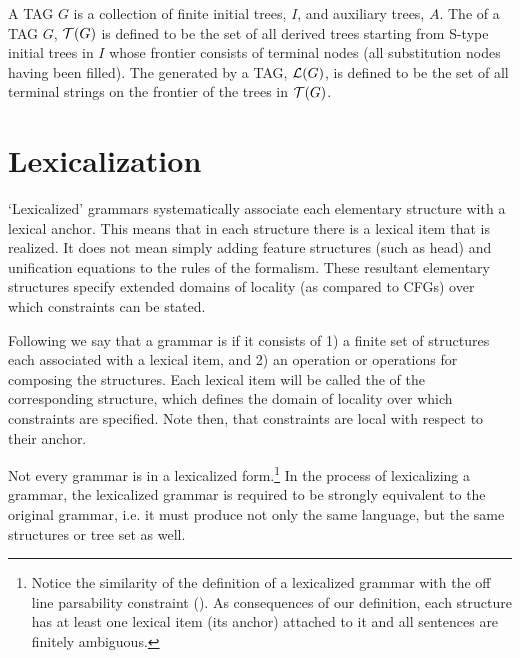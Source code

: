 A TAG $G$ is a collection of finite initial trees, $I$, and auxiliary trees, 
$A$.  The  of a TAG $G$, ${\cal T}(G)$ is defined to be the 
set of all derived trees starting from S-type initial trees in $I$ whose 
frontier consists of terminal nodes (all substitution nodes having been 
filled). The  generated by a TAG, ${\cal L}(G)$, is 
defined to be the set of all terminal strings on the frontier of the trees in 
${\cal T}(G)$. 
 
\section{Lexicalization} 
 
`Lexicalized' grammars systematically associate each elementary structure with 
a lexical anchor. This means that in each structure there is a lexical item 
that is realized.  It does not mean simply adding feature structures (such as 
head) and unification equations to the rules of the formalism.  These resultant 
elementary structures specify extended domains of locality (as compared to 
CFGs) over which constraints can be stated. 
 
Following \cite{schabes88} we say that a grammar is  if it 
consists of 1) a finite set of structures each associated with a lexical item, 
and 2) an operation or operations for composing the structures.  Each lexical 
item will be called the  of the corresponding structure, which 
defines the domain of locality over which constraints are specified.  Note 
then, that constraints are local with respect to their anchor. 
 
Not every grammar is in a lexicalized form.\footnote{Notice the similarity of the definition of a lexicalized grammar with the off line parsability constraint (\cite{kaplan83}). As consequences of our definition, each structure has at least one lexical item (its anchor) attached to it and all sentences are finitely ambiguous.} In the process of lexicalizing a grammar, the lexicalized 
grammar is required to be strongly equivalent to the original grammar, i.e. it 
must produce not only the same language, but the same structures or tree set as 
well. 
 
